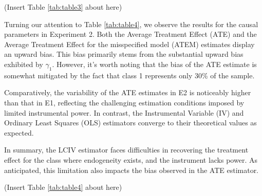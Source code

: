 \documentclass[12pt]{article}
\begin{document}
\begin{center}
	(Insert Table \ref{tab:table3} about here)
\end{center}


Turning our attention to Table \ref{tab:table4}, we observe the results for the causal parameters in Experiment 2. Both the Average Treatment Effect (ATE) and the Average Treatment Effect for the misspecified model (ATEM) estimates display an upward bias. This bias primarily stems from the substantial upward bias exhibited by $\gamma_1$. However, it's worth noting that the bias of the ATE estimate is somewhat mitigated by the fact that class 1 represents only 30\% of the sample.



Comparatively, the variability of the ATE estimates in E2 is noticeably higher than that in E1, reflecting the challenging estimation conditions imposed by limited instrumental power. In contrast, the Instrumental Variable (IV) and Ordinary Least Squares (OLS) estimators converge to their theoretical values as expected.

In summary, the LCIV estimator faces difficulties in recovering the treatment effect for the class where endogeneity exists, and the instrument lacks power. As anticipated, this limitation also impacts the bias observed in the ATE estimator.

\begin{center}
	(Insert Table \ref{tab:table4} about here)
\end{center}
\end{document}

